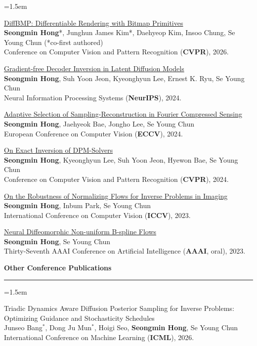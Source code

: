 \documentclass[a4paper,11pt]{article}
\newcommand{\sectitle}[1]{
    \vspace{2ex}
    {\Large\textbf{#1}}
    \vspace{0.5ex}
    \hrule
    \vspace{1.5ex}
}
\newenvironment{cvcontent}{
    \begin{list}{}{
        \leftmargin=1.5em %
        \labelwidth=0pt
        \labelsep=0pt
    }\item[]
}{
    \end{list}
}
\begin{document}
\begin{cvcontent}
\href{https://diffbmp.com/}{DiffBMP: Differentiable Rendering with Bitmap Primitives}\\
\textbf{Seongmin Hong}*, Junghun James Kim*, Daehyeop Kim, Insoo Chung, Se Young Chun (*co-first authored)\\
Conference on Computer Vision and Pattern Recognition (\textbf{CVPR}), 2026.

\href{https://smhongok.github.io/dec-inv.html}{Gradient-free Decoder Inversion in Latent Diffusion Models}\\
\textbf{Seongmin Hong}, Suh Yoon Jeon, Kyeonghyun Lee, Ernest K. Ryu, Se Young Chun\\
Neural Information Processing Systems (\textbf{NeurIPS}), 2024.

\href{https://smhongok.github.io/ada-sel.html}{Adaptive Selection of Sampling-Reconstruction in Fourier Compressed Sensing}\\
\textbf{Seongmin Hong}, Jaehyeok Bae, Jongho Lee, Se Young Chun\\
European Conference on Computer Vision (\textbf{ECCV}), 2024.

\href{https://smhongok.github.io/inv-dpm.html}{On Exact Inversion of DPM-Solvers}\\
\textbf{Seongmin Hong}, Kyeonghyun Lee, Suh Yoon Jeon, Hyewon Bae, Se Young Chun\\
Conference on Computer Vision and Pattern Recognition (\textbf{CVPR}), 2024.

\href{https://smhongok.github.io/robustness.html}{On the Robustness of Normalizing Flows for Inverse Problems in Imaging}\\
\textbf{Seongmin Hong}, Inbum Park, Se Young Chun\\
International Conference on Computer Vision (\textbf{ICCV}), 2023.

\href{https://smhongok.github.io/nubsf.html}{Neural Diffeomorphic Non-uniform B-spline Flows}\\
\textbf{Seongmin Hong}, Se Young Chun\\
Thirty-Seventh AAAI Conference on Artificial Intelligence (\textbf{AAAI}, oral), 2023.

\end{cvcontent}
\sectitle{Other Conference Publications}
\begin{cvcontent}
Triadic Dynamics Aware Diffusion Posterior Sampling for Inverse Problems: Optimizing Guidance and Stochasticity Schedules\\
Junseo Bang$^*$, Dong Ju Mun$^*$, Hoigi Seo, \textbf{Seongmin Hong}, Se Young Chun\\
International Conference on Machine Learning (\textbf{ICML}), 2026.

\end{cvcontent}
\end{document}
